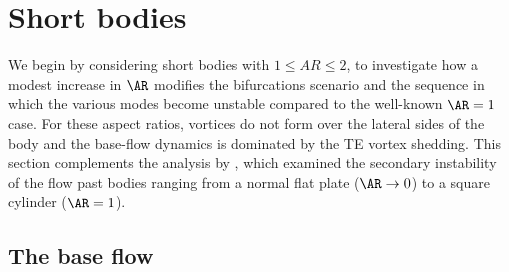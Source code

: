 \section{Short bodies}
\label{sec:short}

We begin by considering short bodies with $1 \le AR \le 2$, to investigate how a modest increase in $\AR$ modifies the bifurcations scenario and the sequence in which the various modes become unstable compared to the well-known $\AR=1$ case. For these aspect ratios, vortices do not form over the lateral sides of the body and the base-flow dynamics is dominated by the TE vortex shedding. This section complements the analysis by \cite{choi-yang-2014}, which examined the secondary instability of the flow past bodies ranging from a normal flat plate ($\AR \rightarrow 0$) to a square cylinder ($\AR=1$).

\subsection{The base flow}

